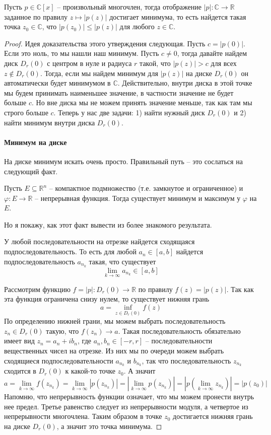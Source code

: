\begin{claim}
Пусть $p\in \mathbb C[x]$ -- произвольный многочлен, тогда отображение $|p|\colon \mathbb C\to \mathbb R$ заданное по правилу $z\mapsto |p(z)|$ достигает минимума, то есть найдется такая точка $z_0\in\mathbb C$, что $|p(z_0)|\leqslant |p(z)|$ для любого $z\in \mathbb C$.
\end{claim}
\begin{proof}
Идея доказательства этого утверждения следующая. Пусть $c = |p(0)|$. Если это ноль, то мы нашли наш минимум. Пусть $c\neq 0$, тогда давайте найдем диск $D_r(0)$ с центром в нуле и радиуса $r$ такой, что $|p(z)| > c$ для всех $z\notin D_r(0)$. Тогда, если мы найдем минимум для $|p(z)|$ на диске $D_r(0)$ он автоматически будет минимумом в $\mathbb C$. Действительно, внутри диска в этой точке мы будем принимать наименьшее значение, в частности значение не будет больше $c$. Но вне диска мы не можем принять значение меньше, так как там мы строго больше $c$. Теперь у нас две задачи: 1) найти нужный диск $D_r(0)$ и 2) найти минимум внутри диска $D_r(0)$.


\paragraph{Минимум на диске}

На диске минимум искать очень просто. Правильный путь -- это сослаться на следующий факт.
\begin{claim*}[БД]
Пусть $E\subseteq \mathbb R^n$ -- компактное подмножество (т.е. замкнутое и ограниченное) и $\varphi\colon E \to \mathbb R$ -- непрерывная функция. Тогда существует минимум и максимум у $\varphi$ на $E$.
\end{claim*}

Но я покажу, как этот факт вывести из более знакомого результата. 
\begin{claim*}[БД]
У любой последовательности на отрезке найдется сходящаяся подпоследовательность. То есть для любой $a_n\in [a, b]$ найдется подпоследовательность $a_{n_k}$ такая, что существует
\[
\lim_{k\to \infty}a_{n_k}\in [a, b]
\]
\end{claim*}

Рассмотрим функцию $f = |p|\colon D_r(0)\to \mathbb R$ по правилу $f(z) = |p(z)|$. Так как эта функция ограничена снизу нулем, то существует нижняя грань
\[
a = \inf_{z\in D_r(0)} f(z)
\]
По определению нижней грани, мы можем выбрать последовательность $z_n\in D_r(0)$ такую, что $f(z_n) \to a$. Такая последовательность обязательно имеет вид $z_n = a_n + i b_n$, где $a_n, b_n\in [-r, r]$ -- последовательности вещественных чисел на отрезке. Из них мы по очереди можем выбрать сходящиеся подпоследовательности $a_{n_k}$ и $b_{n_k}$, так что последовательность $z_{n_k}$ сходится в $D_r(0)$ к какой-то точке $z_0$. А значит
\[
a = \lim_{k\to \infty} f(z_{n_k}) = \lim_{k\to \infty} |p(z_{n_k})| = \left|\lim_{k\to \infty} p(z_{n_k})\right| = \left|p\left(\lim_{k\to \infty} z_{n_k}\right)\right| = |p(z_0)|
\]
Напомню, что непрерывность функции означает, что мы можем пронести внутрь нее предел. Третье равенство следует из непрерывности модуля, а четвертое из непрерывности многочлена. Таким образом в точке $z_0$ достигается нижняя грань на диске $D_r(0)$, а значит это точка минимума.



\end{proof}
